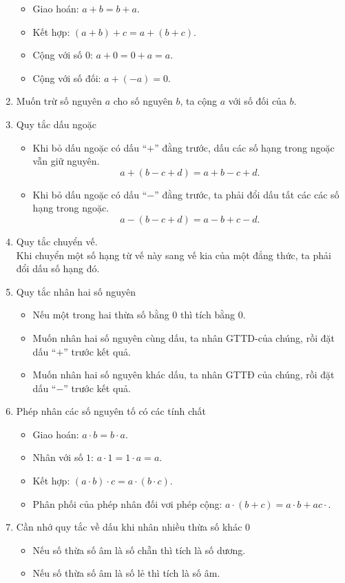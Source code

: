 \begin{enumerate}
			\begin{itemize}
				\item Giao hoán: $a+b = b+a$.
				\item Kết hợp: $(a+b)+c = a+(b+c)$.
				\item Cộng với số $0$:  $a+0 = 0+a = a$.
				\item Cộng với số đối: $a+(-a) = 0$.
			\end{itemize}
		\item Muốn trừ số nguyên $a$ cho số nguyên $b$, ta cộng $a$ với số đối của $b$.
	   \item  Quy tắc dấu ngoặc
		   \begin{itemize}
				\item Khi bỏ dấu ngoặc có dấu “$+$” đằng trước, dấu các số hạng trong ngoặc vẫn giữ nguyên. $$a+(b-c+d)=a+b-c+d.$$
				\item Khi bỏ dấu ngoặc có dấu “$-$”  đằng trước, ta phải đổi dấu tất các các số hạng trong ngoặc. $$a-(b-c+d)=a-b+c-d.$$
			\end{itemize}
		\item Quy tắc chuyển vế.\\
		Khi chuyển một số hạng từ vế này sang vế kia của một đẳng thức, ta phải đổi dấu số hạng đó.
		\item  Quy tắc nhân hai số nguyên
		   \begin{itemize}
				\item Nếu một trong hai thừa số bằng $0$ thì tích bằng $0$.
				\item Muốn nhân hai số nguyên cùng dấu, ta nhân GTTD-của chúng, rồi đặt dấu “$+$” trước kết quả.
				\item Muốn nhân hai số nguyên khác dấu, ta nhân GTTĐ của chúng, rồi đặt dấu “$-$” trước kết quả.
			\end{itemize}
		\item  Phép nhân các số nguyên tố có các tính chất
		   \begin{itemize}
				\item Giao hoán: $a\cdot b = b\cdot a$.
				\item Nhân với số $1$: $a\cdot 1 = 1\cdot a = a$.
				\item Kết hợp: $(a\cdot b)\cdot c = a\cdot (b\cdot c)$.
				\item Phân phối của phép nhân đối vơi phép cộng: $a\cdot (b+c) = a\cdot b+ac\cdot $.
			\end{itemize}
		\item  Cần nhớ quy tắc về dấu khi nhân nhiều thừa số khác $0$
		   \begin{itemize}
				\item Nếu số thừa số âm là số chẵn thì tích là số dương.
				\item Nếu số thừa số âm là số lẻ thì tích là số âm.
			\end{itemize}
	\end{enumerate}
